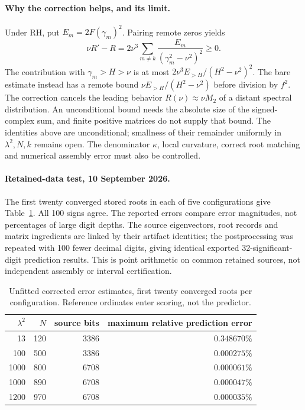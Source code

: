 \paragraph{Why the correction helps, and its limit.}
Under RH, put $E_m=2F(\gamma_m)^2$. Pairing remote zeros yields
\begin{equation}\label{eq:divided-secondweight}
 \nu R'-R=2\nu^3\sum_{m\ne k}
       \frac{E_m}{(\gamma_m^2-\nu^2)^2}\ge0.
\end{equation}
The contribution with $\gamma_m>H>\nu$ is at most
$2\nu^3E_{>H}/(H^2-\nu^2)^2$. The bare estimate instead has a
remote bound $\nu E_{>H}/(H^2-\nu^2)$ before division by $f^2$.
The correction cancels the leading behavior $R(\nu)\approx\nu M_2$ of
a distant spectral distribution. An unconditional bound needs the
absolute size of the signed-complex sum, and finite positive matrices
do not supply that bound. The identities above are unconditional; smallness
of their remainder uniformly in $\lambda^2,N,k$ remains open.
The denominator $\kappa$, local curvature, correct root matching and
numerical assembly error must also be controlled.

\paragraph{Retained-data test, 10 September 2026.}
The first twenty converged stored roots in each of five configurations
give Table~\ref{tab:divided-test}. All 100 signs agree. The reported
errors compare error magnitudes, not percentages of large digit depths.
The source eigenvectors, root records and matrix ingredients are linked
by their artifact identities; the postprocessing was repeated with 100
fewer decimal digits, giving identical exported 32-significant-digit
prediction results. This is point arithmetic on common retained sources,
not independent assembly or interval certification.

\begin{table}[htbp]
\centering\small
\begin{tabular}{@{}rrrr@{}}
\toprule
$\lambda^2$ & $N$ & source bits & maximum relative prediction error \\
\midrule
13 & 120 & 3386 & $0.348670\%$ \\
100 & 500 & 3386 & $0.000275\%$ \\
1000 & 800 & 6708 & $0.000061\%$ \\
1000 & 890 & 6708 & $0.000047\%$ \\
1200 & 970 & 6708 & $0.000035\%$ \\
\bottomrule
\end{tabular}
\caption{Unfitted corrected error estimates, first twenty converged roots
per configuration. Reference ordinates enter scoring, not the predictor.}
\label{tab:divided-test}
\end{table}

